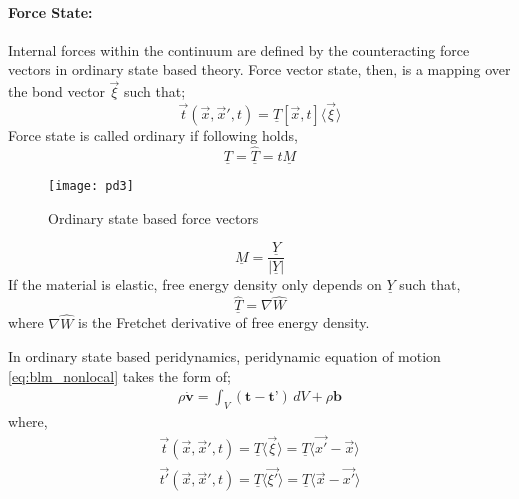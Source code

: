 \documentclass[10pt,a4paper,onecolumn]{article}
\begin{document}
\paragraph{Force State:}
Internal forces within the continuum are defined by the counteracting force vectors in ordinary state based theory. Force vector state, then, is a mapping over the bond vector $\vec{\xi}$ such that;
\begin{equation}
\vec{t}(\vec{x},\vec{x}',t) = \underline{T}[\vec{x},t]\langle\vec{\xi}\rangle
\end{equation}
Force state is called ordinary if following holds, 
\begin{equation}
\underline{T} = \hat{\underline{T}} =t\underline{M}
\end{equation}
\begin{figure}[h!]
\centering
\caption{Ordinary state based force vectors}
\texttt{[image: pd3]}
\end{figure}
\begin{equation}
\underline{M} = \frac{\underline{Y}}{|\underline{Y}|}
\end{equation}
If the material is elastic, free energy density only depends on $\underline{Y}$ such that,
\begin{equation}
\hat{\underline{T}} =\nabla\hat{W}
\end{equation}
where $\nabla\hat{W}$ is the Fretchet derivative of free energy density.

In ordinary state based peridynamics, peridynamic equation of motion \ref{eq:blm_nonlocal}	takes the form of; 
\begin{align}
\rho \dot{\textbf{v}}=\int_{V}(\textbf{t}-\textbf{t'})\,dV + \rho\textbf{b}
\end{align}
where, 
\begin{align}
\vec{t}(\vec{x},\vec{x}',t) = \underline{T}\langle\vec{\xi}\rangle=\underline{T}\langle\vec{x'}-\vec{x}\rangle\\
\vec{t'}(\vec{x},\vec{x}',t) = \underline{T}\langle\vec{\xi'}\rangle=\underline{T}\langle\vec{x}-\vec{x'}\rangle
\end{align}
\end{document}
